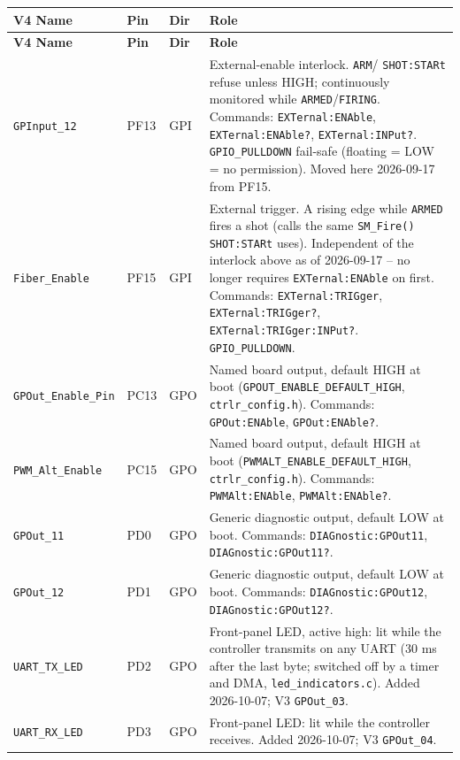\documentclass[11pt]{article}
\newcommand{\code}[1]{\texttt{#1}}
\begin{document}
\begin{longtable}{p{1.0in} p{0.5in} p{0.55in} p{2.6in}}
  \hline
  \textbf{V4 Name} & \textbf{Pin} & \textbf{Dir} & \textbf{Role} \\
  \hline
  \endfirsthead
  \hline
  \textbf{V4 Name} & \textbf{Pin} & \textbf{Dir} & \textbf{Role} \\
  \hline
  \endhead
  \code{GPInput\_12} & PF13 & GPI & External-enable interlock. \code{ARM}/
    \code{SHOT:STARt} refuse unless HIGH; continuously monitored
    while \code{ARMED}/\code{FIRING}. Commands: \code{EXTernal:ENAble},
    \code{EXTernal:ENAble?}, \code{EXTernal:INPut?}. \code{GPIO\_PULLDOWN}
    fail-safe (floating = LOW = no permission). Moved here 2026-09-17
    from PF15. \\
  \code{Fiber\_Enable} & PF15 & GPI & External trigger. A rising edge
    while \code{ARMED} fires a shot (calls the same \code{SM\_Fire()}
    \code{SHOT:STARt} uses). Independent of the interlock above
    as of 2026-09-17 -- no longer requires \code{EXTernal:ENAble} on
    first. Commands: \code{EXTernal:TRIGger}, \code{EXTernal:TRIGger?},
    \code{EXTernal:TRIGger:INPut?}. \code{GPIO\_PULLDOWN}. \\
  \code{GPOut\_Enable\_Pin} & PC13 & GPO & Named board output, default
    HIGH at boot (\code{GPOUT\_ENABLE\_DEFAULT\_HIGH},
    \code{ctrlr\_config.h}). Commands: \code{GPOut:ENAble},
    \code{GPOut:ENAble?}. \\
  \code{PWM\_Alt\_Enable} & PC15 & GPO & Named board output, default
    HIGH at boot (\code{PWMALT\_ENABLE\_DEFAULT\_HIGH},
    \code{ctrlr\_config.h}). Commands: \code{PWMAlt:ENAble},
    \code{PWMAlt:ENAble?}. \\
  \code{GPOut\_11} & PD0 & GPO & Generic diagnostic output, default LOW
    at boot. Commands: \code{DIAGnostic:GPOut11},
    \code{DIAGnostic:GPOut11?}. \\
  \code{GPOut\_12} & PD1 & GPO & Generic diagnostic output, default LOW
    at boot. Commands: \code{DIAGnostic:GPOut12},
    \code{DIAGnostic:GPOut12?}. \\
  \code{UART\_TX\_LED} & PD2 & GPO & Front-panel LED, active high: lit
    while the controller transmits on any UART (30 ms after the last byte;
    switched off by a timer and DMA, \code{led\_indicators.c}). Added
    2026-10-07; V3 \code{GPOut\_03}. \\
  \code{UART\_RX\_LED} & PD3 & GPO & Front-panel LED: lit while the
    controller receives. Added 2026-10-07; V3 \code{GPOut\_04}. \\

\end{longtable}
\end{document}
